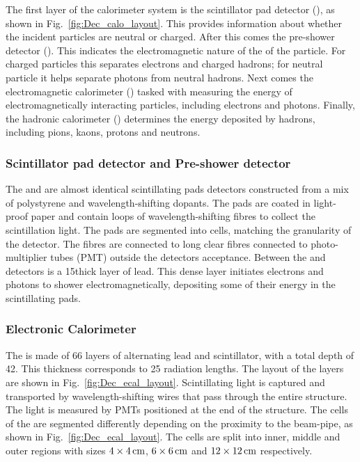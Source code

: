 The first layer of the calorimeter system is the scintillator pad detector (\spd), as shown in Fig.~\ref{fig:Dec_calo_layout}. This provides information about whether the incident particles are neutral or charged. After this comes the pre-shower detector (\presh). This indicates the electromagnetic nature of the of the particle. For charged particles this separates electrons and charged hadrons; for neutral particle it helps separate photons from neutral hadrons. Next comes the electromagnetic calorimeter (\ecal) tasked with measuring the energy of electromagnetically interacting particles, including electrons and photons. Finally, the hadronic calorimeter (\hcal) determines the energy deposited by hadrons, including pions, kaons, protons and neutrons. 

\subsubsection{Scintillator pad detector and Pre-shower detector}

The \spd and \presh are almost identical scintillating pads detectors constructed from a mix of polystyrene and wavelength-shifting dopants. The pads are coated in light-proof paper and contain loops of wavelength-shifting fibres to collect the scintillation light. The pads are segmented into cells, matching the granularity of the \ecal detector.
The fibres are connected to long clear fibres connected to photo-multiplier tubes (PMT) outside the detectors acceptance. Between the \spd and \presh detectors is a 15\mm thick layer of lead. This dense layer initiates electrons and photons to shower electromagnetically, depositing some of their energy in the \presh scintillating pads.    


\subsubsection{Electronic Calorimeter}


The \ecal is made of 66 layers of alternating lead and scintillator, with a total depth of 42\cm. This thickness corresponds to 25 radiation lengths. The layout of the layers are shown in Fig.~\ref{fig:Dec_ecal_layout}. Scintillating light is captured and transported by wavelength-shifting wires that pass through the entire structure. The light is measured by PMTs positioned at the end of the structure. The cells of the \ecal are segmented differently depending on the proximity to the beam-pipe, as shown in Fig.~\ref{fig:Dec_ecal_layout}. The cells are split into inner, middle and outer regions with sizes $4\times 4\mathrm{ \,cm}$, $6\times 6\mathrm{ \,cm}$ and $12\times 12\mathrm{ \,cm}$ respectively. 

